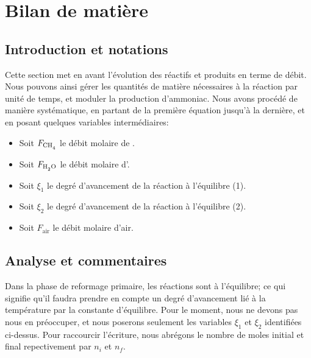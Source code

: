 
\section{Bilan de matière}

\subsection{Introduction et notations}

Cette section met en avant l'évolution des réactifs et produits en terme de débit. 
Nous pouvons ainsi gérer les quantités de matière nécessaires à la réaction par unité de temps, et
moduler la production d'ammoniac. Nous avons procédé de manière systématique, en partant de la première
équation jusqu'à la dernière, et en posant quelques 
variables intermédiaires:

\begin{itemize}
	\item Soit $F_{}$ le débit molaire de \ce{CH4}.
	\item Soit $F_{}$ le débit molaire d'\ce{H2O}.
	\item Soit $\xi_1$ le degré d'avancement de la réaction à l'équilibre (1).
	\item Soit $\xi_2$ le degré d'avancement de la réaction à l'équilibre (2).
	\item Soit $F_{\text{air}}$ le débit molaire d'air.
\end{itemize}

\subsection{Analyse et commentaires}
Dans la phase de reformage primaire, les réactions sont à l'équilibre; ce qui signifie qu'il faudra prendre en 
compte un degré d'avancement lié à la température par la constante d'équilibre. Pour le moment, nous ne devons pas 
nous en préoccuper, et nous poserons seulement les variables $\xi_1$ et $\xi_2$ identifiées ci-dessus. Pour raccourcir
l'écriture, nous abrégons le nombre de moles initial et final repectivement par $n_i$ et $n_f$.

